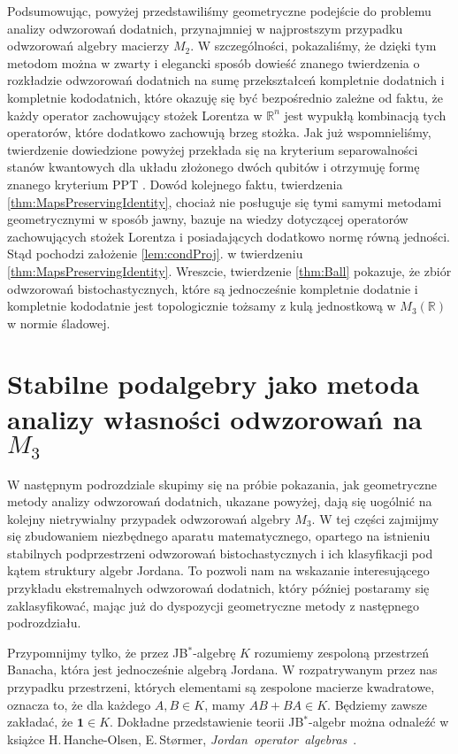 {Podsumowując, powyżej przedstawiliśmy geometryczne podejście do problemu
analizy odwzorowań dodatnich, przynajmniej w najprostszym przypadku odwzorowań
algebry macierzy $M_{2}$.
W szczególności,
pokazaliśmy, że dzięki tym metodom można w zwarty i elegancki sposób dowieść
znanego twierdzenia o rozkładzie odwzorowań dodatnich na sumę przekształceń
kompletnie dodatnich i kompletnie kododatnich,
które okazuję się być bezpośrednio zależne od faktu, że każdy operator
zachowujący stożek Lorentza w $\mathbb{R}^{n}$ jest wypukłą kombinacją tych
operatorów, które dodatkowo zachowują brzeg stożka.
Jak już wspomnieliśmy, twierdzenie dowiedzione powyżej
przekłada się na kryterium separowalności stanów kwantowych dla układu
złożonego dwóch qubitów i otrzymuję formę znanego kryterium PPT
\cite{peres1996separability,horodecki1996separability}.
Dowód kolejnego faktu, twierdzenia \ref{thm:MapsPreservingIdentity},
chociaż nie posługuje się tymi samymi metodami geometrycznymi w sposób jawny,
bazuje na wiedzy dotyczącej operatorów zachowujących stożek Lorentza i posiadających
dodatkowo normę równą jedności.
Stąd pochodzi założenie \ref{lem:condProj}. w twierdzeniu \ref{thm:MapsPreservingIdentity}.
Wreszcie, twierdzenie \ref{thm:Ball} pokazuje, że zbiór odwzorowań bistochastycznych,
które są jednocześnie kompletnie dodatnie i kompletnie kododatnie jest
topologicznie tożsamy z kulą jednostkową w $M_{3}(\mathbb{R})$ w normie śladowej.


\section{Stabilne podalgebry jako metoda analizy własności odwzorowań na $M_{3}$}
\label{sec:M3notes}

W następnym podrozdziale skupimy się na próbie pokazania,
jak geometryczne metody analizy odwzorowań dodatnich,
ukazane powyżej,
dają się uogólnić na kolejny nietrywialny przypadek odwzorowań algebry $M_{3}$.
W tej części zajmijmy się zbudowaniem niezbędnego aparatu matematycznego,
opartego na istnieniu stabilnych podprzestrzeni odwzorowań bistochastycznych
i ich klasyfikacji pod kątem struktury algebr Jordana.
To pozwoli nam na wskazanie interesującego przykładu ekstremalnych odwzorowań
dodatnich, który później postaramy się zaklasyfikować, mając już do dyspozycji
geometryczne metody z następnego podrozdziału.

Przypomnijmy tylko, że przez JB$^{*}$-algebrę $K$ rozumiemy zespoloną
przestrzeń Banacha, która jest jednocześnie algebrą Jordana.
W rozpatrywanym przez nas przypadku przestrzeni,
których elementami są zespolone macierze kwadratowe,
oznacza to, że dla każdego $A, B \in K$, mamy
$AB + BA \in K$.
Będziemy zawsze zakładać, że $\mathbf{1} \in K$.
Dokładne przedstawienie teorii JB$^{*}$-algebr można odnaleźć w książce
H.\,Hanche-Olsen, E.\,St{\o}rmer,
\mbox{\emph{Jordan operator algebras} \cite{Hanche1984}}.

}
